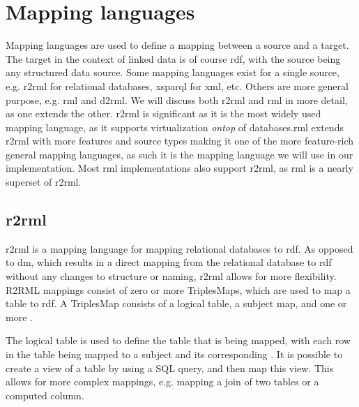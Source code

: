 \section{Mapping languages}
Mapping languages are used to define a mapping between a source and a target. The target in the context of linked data is of course \acrshort{rdf}, with the source being any structured data source. Some mapping languages exist for a single source, e.g. \acrfull{r2rml} for relational databases, \acrfull{xsparql} for \acrshort{xml}, etc. Others are more general purpose, e.g. \acrfull{rml} and \acrfull{d2rml}.
We will discuss both \acrshort{r2rml} and \acrshort{rml} in more detail, as one extends the other. \acrshort{r2rml} is significant as it is the most widely used mapping language, as it supports virtualization \textit{ontop} of databases.\acrshort{rml} extends \acrshort{r2rml} with more features and source types making it one of the more feature-rich general mapping languages, as such it is the mapping language we will use in our implementation.
Most \acrshort{rml} implementations also support \acrshort{r2rml}, as \acrshort{rml} is a nearly superset of \acrshort{r2rml}.

\subsection{\acrshort{r2rml}}
\acrfull{r2rml} is a mapping language for mapping relational databases to \acrshort{rdf}. As opposed to \acrfull{dm}, which results in a direct mapping from the relational database to \acrshort{rdf} without any changes to structure or naming, \acrshort{r2rml} allows for more flexibility. R2RML mappings consist of zero or more TriplesMaps, which are used to map a table to \acrshort{rdf}. A TriplesMap consists of a logical table, a subject map, and one or more .

The logical table is used to define the table that is being mapped, with each row in the table being mapped to a subject and its corresponding . It is possible to create a view of a table by using a SQL query, and then map this view. This allows for more complex mappings, e.g. mapping a join of two tables or a computed column.


